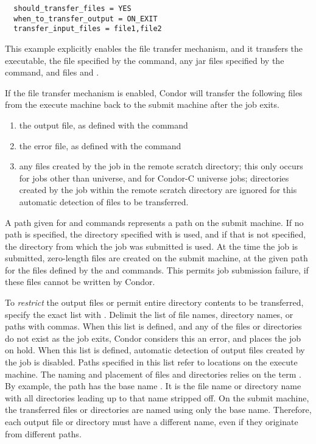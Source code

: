 \begin{verbatim}
  should_transfer_files = YES
  when_to_transfer_output = ON_EXIT
  transfer_input_files = file1,file2 
\end{verbatim}
This example explicitly enables the file transfer mechanism,
and it transfers the executable, the file specified by the 
command, any jar files specified by the  command,
and files  and .

If the file transfer mechanism is enabled,
Condor will transfer the following files from the execute machine
back to the submit machine after the job exits.
\begin{enumerate}
  \item the output file, as defined with the  command
  \item the error file, as defined with the  command
  \item any files created by the job in the remote scratch directory;
this only occurs for jobs other than 
universe, and for Condor-C  universe jobs;
directories created by the job within the remote scratch directory
are ignored for this automatic detection of files to be transferred.
\end{enumerate}

A path given for  and  commands represents
a path on the submit machine.  If no path is specified, the directory
specified with  is used, and if that is not specified,
the directory from which the job was submitted is used.
At the time the job is submitted, zero-length files are created
on the submit machine, at the given path for the files defined by the  
 and  commands.
This permits job submission failure, if these files cannot be written by
Condor.

To \emph{restrict} the output files 
or permit entire directory contents to be transferred,
specify the exact list with  .
Delimit the list of file names, directory names, or paths with commas.
When this list is defined, and any of the files or directories
do not exist as the job exits,
Condor considers this an error, and places the job on hold.
When this list is defined, automatic detection of output files created by
the job is disabled.
Paths specified in this list refer to locations on the execute
machine.  
The naming and placement of files and directories relies on the
term .  
By example, the path  has the base name .
It is the file name or directory name with all directories
leading up to that name stripped off.
On the submit machine, the transferred files or directories
are named using only the base name.
Therefore, each output file or directory must have a different name,
even if they originate from different paths.

